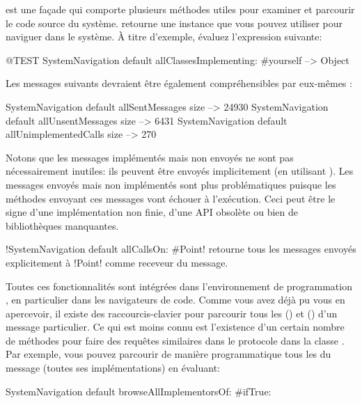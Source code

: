 \documentclass[a4paper,10pt,twoside]{book}
\begin{document}
 est une façade qui comporte plusieurs méthodes utiles pour examiner et parcourir le code source du système.
  retourne une instance que vous pouvez utiliser pour naviguer dans le système. À titre d'exemple, évaluez l'expression suivante:

\begin{code}{@TEST}
SystemNavigation default allClassesImplementing: #yourself --> {Object}
\end{code}

Les messages suivants devraient être également compréhensibles par eux-mêmes :

\begin{code}{}
SystemNavigation default allSentMessages size          --> 24930
SystemNavigation default allUnsentMessages size      --> 6431
SystemNavigation default allUnimplementedCalls size --> 270
\end{code}

Notons que les messages implémentés mais non envoyés ne sont pas nécessairement inutiles: ils peuvent être envoyés implicitement (\eg en utilisant ).
Les messages envoyés mais non implémentés sont plus problématiques puisque les méthodes envoyant ces messages vont échouer à l'exécution. Ceci peut être le signe d'une implémentation non finie, d'une API obsolète ou bien de bibliothèques manquantes.

\ct!SystemNavigation default allCallsOn: #Point! retourne tous les messages envoyés explicitement à \ct!Point! comme receveur du message.

Toutes ces fonctionnalités sont intégrées dans l'environnement de programmation \pharo, en particulier dans les navigateurs de code.
Comme vous avez déjà pu vous en apercevoir, il existe des raccourcis-clavier pour parcourir tous les \immplementors
() et
\sennders
() d'un message particulier.
Ce qui est moins connu est l'existence d'un certain nombre de méthodes pour faire des requêtes similaires dans le protocole  dans la classe .
Par exemple, vous pouvez parcourir de manière programmatique tous les \implementors du message  
(\ie toutes ses implémentations)
en évaluant:
\begin{code}{}
SystemNavigation default browseAllImplementorsOf: #ifTrue:
\end{code}
\end{document}
